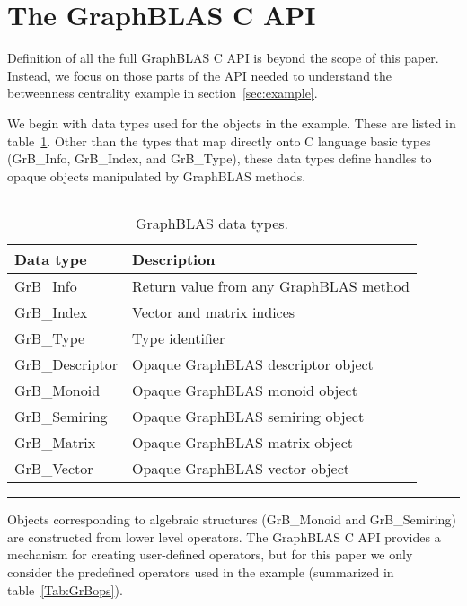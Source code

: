 \section{The GraphBLAS C API}
\label{sec:Capi}

Definition of all the full GraphBLAS C API is  beyond the scope of this paper.  Instead, we 
focus on those parts of the API needed to understand the betweenness centrality
example in section~\ref{sec:example}. 

We begin with data types used for the objects in the example.
These are listed in table~\ref{Tab:GrBdataTypes}.  Other than the types that map directly onto
C language basic types ({\sf GrB\_Info}, {\sf GrB\_Index}, and {\sf GrB\_Type}), these data types
define handles to opaque objects manipulated by GraphBLAS methods.
\begin{table}[h]
\hrule
\begin{center}
\caption{GraphBLAS data types.}
\label{Tab:GrBdataTypes}
\begin{tabular}{lp{5.25cm}}
Data type                     & Description  \\
\hline
	{\sf GrB\_Info}           & Return value from any GraphBLAS method \\
	{\sf GrB\_Index}          & Vector and matrix indices \\
	{\sf GrB\_Type}		      & Type identifier \vspace{.1cm} \\ 
	{\sf GrB\_Descriptor}     & Opaque GraphBLAS descriptor object \\
	{\sf GrB\_Monoid}         & Opaque GraphBLAS monoid object  \\
	{\sf GrB\_Semiring}       & Opaque GraphBLAS semiring object  \\
	{\sf GrB\_Matrix}         & Opaque GraphBLAS matrix object \\
	{\sf GrB\_Vector}         & Opaque GraphBLAS vector object \\
\end{tabular}
\end{center}
\hrule
\end{table}
Objects corresponding to algebraic structures ({\sf GrB\_Monoid} and {\sf GrB\_Semiring}) are constructed from lower level
operators. The GraphBLAS C API provides a mechanism for creating user-defined operators, but for this 
paper we only consider the predefined operators used in the example (summarized
in table~\ref{Tab:GrBops}). 
